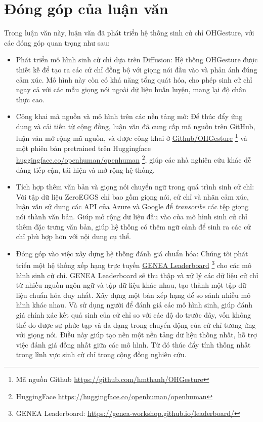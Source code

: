 \section{Đóng góp của luận văn}
\label{sec:contribution}

Trong luận văn này, luận văn đã phát triển hệ thống sinh cử chỉ OHGesture, với các đóng góp quan trọng như sau:

\begin{itemize}
	\item Phát triển mô hình sinh cử chỉ dựa trên Diffusion: Hệ thống OHGesture được thiết kế để tạo ra các cử chỉ đồng bộ với giọng nói đầu vào và phản ánh đúng cảm xúc. Mô hình này còn có khả năng tổng quát hóa, cho phép sinh cử chỉ ngay cả với các mẫu giọng nói ngoài dữ liệu huấn luyện, mang lại độ chân thực cao.
	
	\item Công khai mã nguồn và mô hình trên các nền tảng mở: Để thúc đẩy ứng dụng và cải tiến từ cộng đồng, luận văn đã cung cấp mã nguồn trên GitHub, luận văn mở rộng mã nguồn, và được công khai ở \hyperlink{https://github.com/hmthanh/OHGesture}{Github/OHGesture} \footnote{Mã nguồn Github \url{https://github.com/hmthanh/OHGesture}} và một phiên bản pretrained trên Huggingface \hyperlink{https://huggingface.co/openhuman/openhuman}{huggingface.co/openhuman/openhuman} \footnote{HuggingFace \url{https://huggingface.co/openhuman/openhuman}}, giúp các nhà nghiên cứu khác dễ dàng tiếp cận, tái hiện và mở rộng hệ thống.
	
	\item Tích hợp thêm văn bản và giọng nói chuyển ngữ trong quá trình sinh cử chỉ: Với tập dữ liệu ZeroEGGS chỉ bao gồm giọng nói, cử chỉ và nhãn cảm xúc, luận văn sử dụng các API của Azure và Google để \textit{transcribe} các tệp giọng nói thành văn bản. Giúp mở rộng dữ liệu đầu vào của mô hình sinh cử chỉ thêm đặc trưng văn bản, giúp hệ thống có thêm ngữ cảnh để sinh ra các cử chỉ phù hợp hơn với nội dung cụ thể.
	
	\item Đóng góp vào việc xây dựng hệ thống đánh giá chuẩn hóa: Chúng tôi phát triển một hệ thống xếp hạng trực tuyến \hyperlink{https://genea-workshop.github.io/leaderboard/}{GENEA Leaderboard} \footnote{GENEA Leaderboard: \url{https://genea-workshop.github.io/leaderboard/}} \cite{nagy2024towards} cho các mô hình sinh cử chỉ. GENEA Leaderboard sẽ thu thập và xử lý các dữ liệu cử chỉ từ nhiều nguồn ngôn ngữ và tập dữ liệu khác nhau, tạo thành một tập dữ liệu chuẩn hóa duy nhất. Xây dựng một bản xếp hạng để so sánh nhiều mô hình khác nhau. Và sử dụng người để đánh giá các mô hình sinh, giúp đánh giá chính xác kết quả sinh của cử chỉ so với các độ đo trước đây, vốn không thể đo được sự phức tạp và đa dạng trong chuyển động của cử chỉ tương ứng với giọng nói. Điều này giúp tạo nên một nền tảng dữ liệu thống nhất, hỗ trợ việc đánh giá đồng nhất giữa các mô hình. Từ đó thúc đẩy tính thống nhất trong lĩnh vực sinh cử chỉ trong cộng đồng nghiên cứu.
	

\end{itemize}
